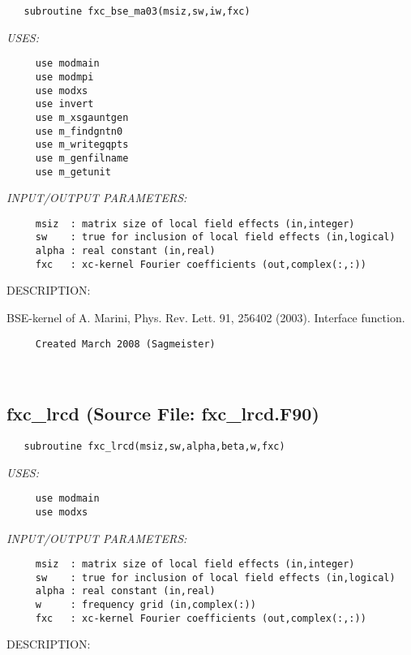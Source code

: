 \documentclass[11pt]{article}
\begin{document}
\begin{verbatim}   subroutine fxc_bse_ma03(msiz,sw,iw,fxc)\end{verbatim}{\em USES:}
\begin{verbatim}     use modmain
     use modmpi
     use modxs
     use invert
     use m_xsgauntgen
     use m_findgntn0
     use m_writegqpts
     use m_genfilname
     use m_getunit\end{verbatim}{\em INPUT/OUTPUT PARAMETERS:}
\begin{verbatim}     msiz  : matrix size of local field effects (in,integer)
     sw    : true for inclusion of local field effects (in,logical)
     alpha : real constant (in,real)
     fxc   : xc-kernel Fourier coefficients (out,complex(:,:))\end{verbatim}
{\sf DESCRIPTION:\\ }


     BSE-kernel of A. Marini, Phys. Rev. Lett. 91, 256402 (2003).
     Interface function.
  
\begin{verbatim}     Created March 2008 (Sagmeister)\end{verbatim}


 
 
\mbox{}\hrulefill\ 
 
\subsection{fxc\_lrcd (Source File: fxc\_lrcd.F90)}


\begin{verbatim}   subroutine fxc_lrcd(msiz,sw,alpha,beta,w,fxc)\end{verbatim}{\em USES:}
\begin{verbatim}     use modmain
     use modxs\end{verbatim}{\em INPUT/OUTPUT PARAMETERS:}
\begin{verbatim}     msiz  : matrix size of local field effects (in,integer)
     sw    : true for inclusion of local field effects (in,logical)
     alpha : real constant (in,real)
     w     : frequency grid (in,complex(:))
     fxc   : xc-kernel Fourier coefficients (out,complex(:,:))\end{verbatim}
{\sf DESCRIPTION:\\ }
\end{document}
